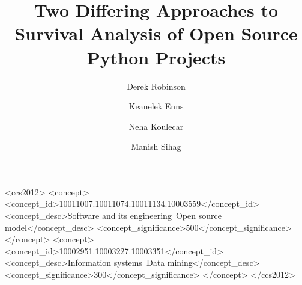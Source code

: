 \documentclass[acmconf]{acmart}
\begin{document}
\graphicspath{ {./img/} }



\title[Survival Analysis of Open Source Projects]{Two Differing Approaches to Survival Analysis of Open Source Python Projects}

\author{Derek Robinson}
\author{Keanelek Enns}
\author{Neha Koulecar}
\author{Manish Sihag}

\renewcommand{\shortauthors}{D. Robinson, K. Enns, N. Koulecar, M. Sihag}

\begin{abstract}
\end{abstract}

\begin{CCSXML}
<ccs2012>
<concept>
<concept_id>10011007.10011074.10011134.10003559</concept_id>
<concept_desc>Software and its engineering~Open source model</concept_desc>
<concept_significance>500</concept_significance>
</concept>
<concept>
<concept_id>10002951.10003227.10003351</concept_id>
<concept_desc>Information systems~Data mining</concept_desc>
<concept_significance>300</concept_significance>
</concept>
</ccs2012>
\end{CCSXML}
\end{document}
